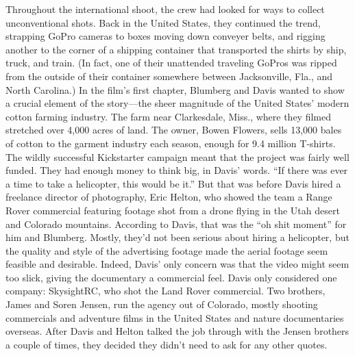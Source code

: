 Throughout the international shoot, the crew had looked for ways to collect
unconventional shots. Back in the United States, they continued the
trend, strapping GoPro cameras to boxes moving down conveyer belts, and
rigging another to the corner of a shipping container that transported the
shirts by ship, truck, and train. (In fact, one of their unattended traveling
GoPros was ripped from the outside of their container somewhere between
Jacksonville, Fla., and North Carolina.)
In the film's first chapter, Blumberg and Davis wanted to show a crucial
element of the story—the sheer magnitude of the United States' modern
cotton farming industry. The farm near Clarkesdale, Miss., where they
filmed stretched over 4,000 acres of land. The owner, Bowen Flowers, sells
13,000 bales of cotton to the garment industry each season, enough for
9.4 million T-shirts.
The wildly successful Kickstarter campaign meant that the project was fairly
well funded. They had enough money to think big, in Davis' words. ``If there
was ever a time to take a helicopter, this would be it.'' But that was before
Davis hired a freelance director of photography, Eric Helton, who showed
the team a Range Rover commercial featuring footage shot from a drone
flying in the Utah desert and Colorado mountains. According to Davis, that
was the ``oh shit moment'' for him and Blumberg. Mostly, they'd not been
serious about hiring a helicopter, but the quality and style of the advertising
footage made the aerial footage seem feasible and desirable. Indeed, Davis'
only concern was that the video might seem too slick, giving the documentary
a commercial feel.
Davis only considered one company: SkysightRC, who shot the Land Rover
commercial. Two brothers, James and Soren Jensen, run the agency out of
Colorado, mostly shooting commercials and adventure films in the United
States and nature documentaries overseas. After Davis and Helton talked
the job through with the Jensen brothers a couple of times, they decided
they didn't need to ask for any other quotes.


